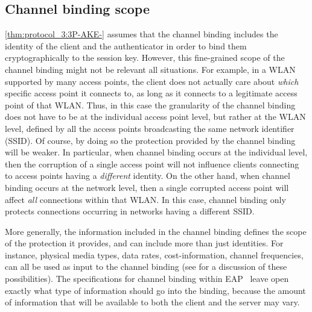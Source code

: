 \subsection{Channel binding scope}\label{sec:EAP:channel-binding_scope}
\cref{thm:protocol_3:3P-AKE-} assumes that the channel binding includes the identity of the client and the authenticator in order to bind them cryptographically to the session key.  
However,
this fine-grained scope of the channel binding might not be relevant all situations.
For example,
in a WLAN supported by many access points,
the client does not actually care about \emph{which} specific access point it connects to,
as long as it connects to a legitimate access point of that WLAN.
Thus, in this case the granularity of the channel binding does not have to be at the individual access point level,
but rather at the WLAN level,
defined by all the access points broadcasting the same network identifier (SSID).  
Of course,
by doing so the protection  provided by the channel binding will be weaker. 
In particular,
when channel binding occurs at the individual level,
then the corruption of a single access point will not influence clients connecting to access points having a \emph{different} identity.
On the other hand, 
when channel binding occurs at the network level,
then a single corrupted access point will affect \emph{all} connections within that WLAN.
In this case,
channel binding only protects connections occurring in networks having a different SSID.


More generally,
the information included in the channel binding defines the scope of the protection it provides,
and can include more than just identities.
For instance,
physical media types,
data rates, cost-information,
channel frequencies,
can all be used as input to the channel binding
(see \cite{ClancyH:2009:making_the_case_EAP_cb} for a discussion of these possibilities). 
The specifications for channel binding within EAP~\cite{IETF:draft:EAP-channel-binding,IETF:RFC6677:EAP-channel-binding}
leave open exactly what type of information should go into the binding,
because the amount of information that will be available to both the client and the server may vary.





